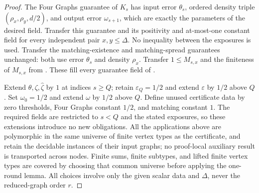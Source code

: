 \begin{proof}
The Four Graphs guarantee of $K_s$ has input error $\theta_s$,
ordered density triple $(\rho_x,\rho_y,d/2)$, and output error
$\omega_{s+1}$, which are exactly the parameters of the desired field.
Transfer this guarantee and its positivity and at-most-one constant field
for every independent pair $x,y\leq\Delta$. No inequality between the
exposures is used. Transfer the matching-existence and matching-spread
guarantees unchanged: both use error $\theta_s$ and density $\rho_x$.
Transfer $1\leq M_{s,x}$ and the finiteness of $M_{s,x}$ from
. These fill every guarantee field of
.

Extend $\theta,\zeta,\widehat\zeta$ by $1$ at indices $s\geq Q$;
retain $\varepsilon_Q=1/2$ and extend $\varepsilon$ by $1/2$ above $Q$.
Set $\omega_0=1/2$ and extend $\omega$ by $1/2$ above $Q$.
Define unused certificate data by zero thresholds, Four Graphs constant
$1/2$, and matching constant $1$. The required fields are restricted to
$s<Q$ and the stated exposures, so these extensions introduce no new
obligations. All the applications above are polymorphic in the same
universe of finite vertex types as the certificate, and retain the
decidable instances of their input graphs; no proof-local auxiliary
result is transported across nodes. Finite sums, finite subtypes, and
lifted finite vertex types are covered by choosing that common universe
before applying the one-round lemma. All choices involve only the given
scalar data and $\Delta$, never the reduced-graph order $r$.
\end{proof}
